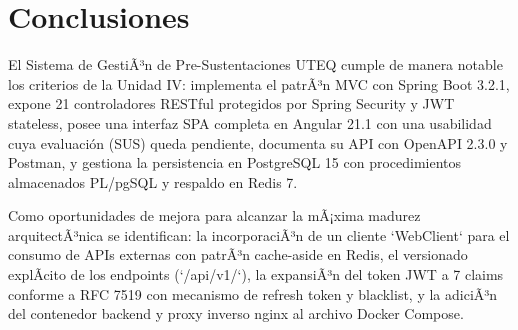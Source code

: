 \section{Conclusiones}
El Sistema de GestiÃ³n de Pre-Sustentaciones UTEQ cumple de manera notable los criterios de la Unidad IV: implementa
el patrÃ³n MVC con Spring Boot 3.2.1, expone 21 controladores RESTful protegidos por Spring Security y JWT stateless,
posee una interfaz SPA completa en Angular 21.1 con una usabilidad cuya evaluación (SUS) queda pendiente, documenta
su API con OpenAPI 2.3.0 y Postman, y gestiona la persistencia en PostgreSQL 15 con procedimientos almacenados PL/pgSQL
y respaldo en Redis 7.

Como oportunidades de mejora para alcanzar la mÃ¡xima madurez arquitectÃ³nica se identifican: la incorporaciÃ³n de
un cliente `WebClient` para el consumo de APIs externas con patrÃ³n cache-aside en Redis, el versionado explÃ­cito de
los endpoints (`/api/v1/`), la expansiÃ³n del token JWT a 7 claims conforme a RFC 7519 con mecanismo de refresh token y
blacklist, y la adiciÃ³n del contenedor backend y proxy inverso nginx al archivo Docker Compose.

